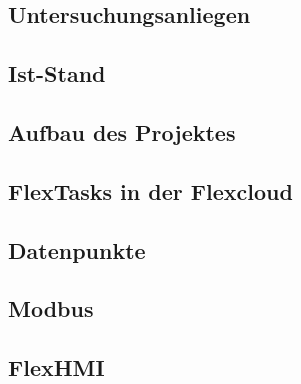 \begin{spacing}{1}
    \section{Untersuchungsanliegen}\label{section:untersuchungsanliegen}
    \end{spacing}


\begin{spacing}{1}
    \section{Ist-Stand}\label{section:ist-standWallbox}
    \end{spacing}


\begin{spacing}{1}
    \section{Aufbau des Projektes}\label{section:aufbaudesProjektesWallbox}
    \end{spacing}


\begin{spacing}{1}
    \section{FlexTasks in der Flexcloud}\label{section:FlexTasks}
    \end{spacing}


\begin{spacing}{1}
    \section{Datenpunkte}\label{section:datapoints}
    \end{spacing}


\begin{spacing}{1}
    \section{Modbus}\label{section:modbus}
    \end{spacing}


\begin{spacing}{1}
    \section{FlexHMI}\label{section:flexHMI}
    \end{spacing}


